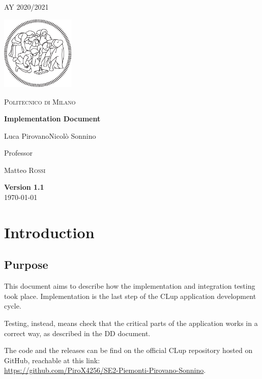 \documentclass[table, 12pt]{article}
\begin{document}
\begin{titlepage}
    \centering
    {\scshape\large AY 2020/2021 \par}
    \vfill
    \includegraphics[width=100pt]{assets/logo-polimi-new}\par\vspace{1cm}
    {\scshape\LARGE Politecnico di Milano \par}
    \vspace{1.5cm}
    {\huge\bfseries Implementation Document \par}
    \vspace{2cm}
    {\Large {Luca Pirovano\quad Nicolò Sonnino}\par}
    \vfill
    {\large Professor\par
        Matteo \textsc{Rossi}}
    \vfill
    {\large \textbf{Version 1.1} \\ \today \par}
\end{titlepage}
\thispagestyle{plain}
\mbox{}
\newpage
{}
\tableofcontents
\newpage
{}

\section{Introduction}
\subsection{Purpose}
This document aims to describe how the implementation and integration testing took place.
Implementation is the last step of the CLup application development cycle.

Testing, instead, means check that the critical parts of the application works in a correct way, as described in the DD document.

The code and the releases can be find on the official CLup repository hosted on GitHub, reachable at this link:\\ \href{https://github.com/PiroX4256/SE2-Piemonti-Pirovano-Sonnino}{https://github.com/PiroX4256/SE2-Piemonti-Pirovano-Sonnino}.
\end{document}
